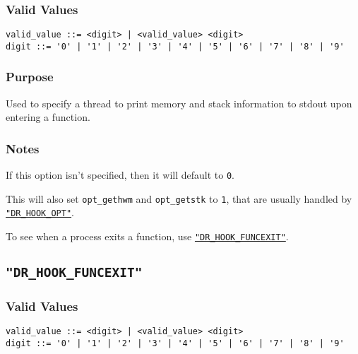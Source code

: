 \subsubsection{Valid Values}
\vspace{-2ex}
\verb+valid_value ::= <digit> | <valid_value> <digit>+ \\
\verb+digit ::= '0' | '1' | '2' | '3' | '4' | '5' | '6' | '7' | '8' | '9'+

\vspace{-2ex}
\subsubsection{Purpose}
\vspace{-2ex}
Used to specify a thread to print memory and stack information to stdout upon entering a function.

\vspace{-2ex}
\subsubsection{Notes}
\vspace{-2ex}
If this option isn't specified, then it will default to \verb|0|.

This will also set \texttt{opt\_gethwm} and \texttt{opt\_getstk} to \verb|1|, that are usually handled by \hyperref[section:flags:DR_HOOK_OPT]{\texttt{"DR\_HOOK\_OPT"}}.

To see when a process exits a function, use \hyperref[section:flags:DR_HOOK_FUNCEXIT]{\texttt{"DR\_HOOK\_FUNCEXIT"}}.



\subsection{\texttt{"DR\_HOOK\_FUNCEXIT"}}
\label{section:flags:DR_HOOK_FUNCEXIT}
\vspace{-2ex}
\subsubsection{Valid Values}
\vspace{-2ex}
\verb+valid_value ::= <digit> | <valid_value> <digit>+ \\
\verb+digit ::= '0' | '1' | '2' | '3' | '4' | '5' | '6' | '7' | '8' | '9'+

\vspace{-2ex}
